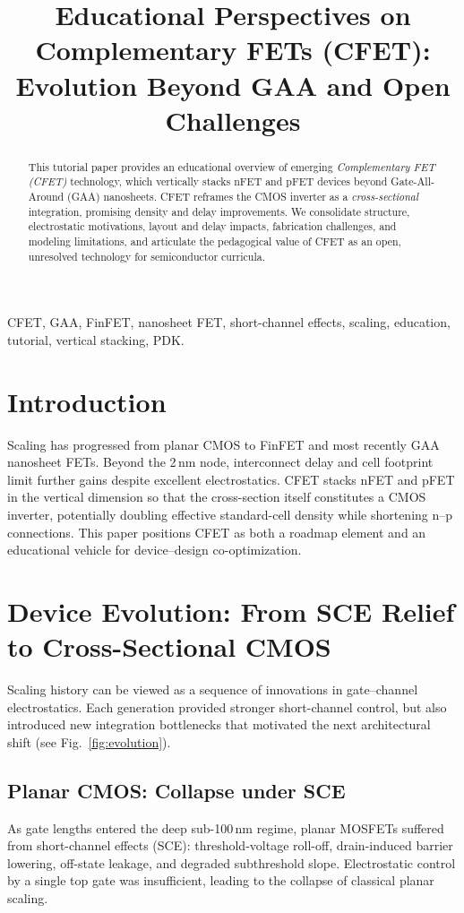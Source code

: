 \documentclass[conference]{IEEEtran}
\title{Educational Perspectives on Complementary FETs (CFET):\\
Evolution Beyond GAA and Open Challenges}
\author{
\IEEEauthorblockN{Shinichi Samizo}
\IEEEauthorblockA{Independent Semiconductor Researcher\\
Project Design Hub, Samizo-AITL\\
\textit{Email:} \href{mailto:shin3t72@gmail.com}{shin3t72@gmail.com}\quad
\textit{GitHub:} \href{https://github.com/Samizo-AITL}{Samizo-AITL}}
}
\begin{document}
\maketitle

\begin{abstract}
This tutorial paper provides an educational overview of emerging
\emph{Complementary FET (CFET)} technology, which vertically stacks nFET and pFET devices beyond Gate-All-Around (GAA) nanosheets.
CFET reframes the CMOS inverter as a \emph{cross-sectional} integration, promising density and delay improvements.
We consolidate structure, electrostatic motivations, layout and delay impacts, fabrication challenges, and modeling limitations, and articulate the pedagogical value of CFET as an open, unresolved technology for semiconductor curricula.
\end{abstract}

\begin{IEEEkeywords}
CFET, GAA, FinFET, nanosheet FET, short-channel effects, scaling, education, tutorial, vertical stacking, PDK.
\end{IEEEkeywords}

\section{Introduction}
Scaling has progressed from planar CMOS to FinFET and most recently GAA nanosheet FETs.
Beyond the 2\,nm node, interconnect delay and cell footprint limit further gains despite excellent electrostatics.
CFET stacks nFET and pFET in the vertical dimension so that the cross-section itself constitutes a CMOS inverter, potentially doubling effective standard-cell density while shortening n--p connections.
This paper positions CFET as both a roadmap element and an educational vehicle for device--design co-optimization.

\section{Device Evolution: From SCE Relief to Cross-Sectional CMOS}
Scaling history can be viewed as a sequence of innovations in gate–channel electrostatics.
Each generation provided stronger short-channel control, but also introduced new integration bottlenecks that motivated the next architectural shift (see Fig.~\ref{fig:evolution}).

\subsection{Planar CMOS: Collapse under SCE}
As gate lengths entered the deep sub-100\,nm regime, planar MOSFETs suffered from short-channel effects (SCE): threshold-voltage roll-off, drain-induced barrier lowering, off-state leakage, and degraded subthreshold slope.
Electrostatic control by a single top gate was insufficient, leading to the collapse of classical planar scaling.
\end{document}
